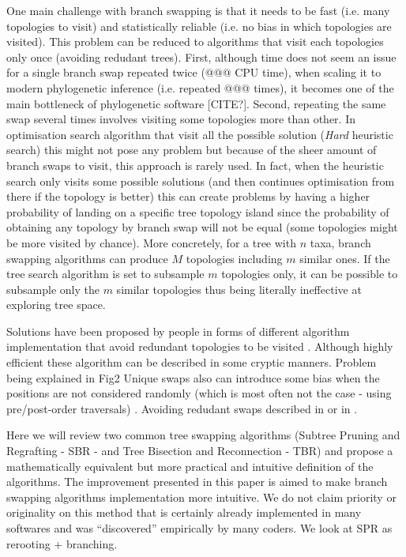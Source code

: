 \documentclass[12pt,letterpaper]{article}
\begin{document}
One main challenge with branch swapping is that it needs to be fast (i.e. many topologies to visit) and statistically reliable (i.e. no bias in which topologies are visited).
This problem can be reduced to algorithms that visit each topologies only once (avoiding redudant trees). \citep{goloboff2014bias}
First, although time does not seem an issue for a single branch swap repeated twice (@@@ CPU time), when scaling it to modern phylogenetic inference (i.e. repeated @@@ times), it becomes one of the main bottleneck of phylogenetic software [CITE?].
Second, repeating the same swap several times involves visiting some topologies more than other.
In optimisation search algorithm that visit all the possible solution (\textit{Hard} heuristic search) %
 this might not pose any problem but because of the sheer amount of branch swaps to visit, this approach is rarely used.
In fact, when the heuristic search only visits some possible solutions (and then continues optimisation from there if the topology is better) this can create problems by having a higher probability of landing on a specific tree topology island since the probability of obtaining any topology by branch swap will not be equal (some topologies might be more visited by chance).
More concretely, for a tree with $n$ taxa, branch swapping algorithms can produce $M$ topologies including $m$ similar ones.
If the tree search algorithm is set to subsample $m$ topologies only, it can be possible to subsample only the $m$ similar topologies thus being literally ineffective at exploring tree space.

Solutions have been proposed by people in forms of different algorithm implementation that avoid redundant topologies to be visited \citep{allen2001subtree}.
Although highly efficient these algorithm can be described in some cryptic manners.
Problem being explained in Fig2 \cite{goloboff2014bias}
Unique swaps also can introduce some bias when the positions are not considered randomly (which is most often not the case - using pre/post-order traversals) \citep{goloboff2014bias}.
Avoiding redudant swaps described in \cite{allen2001subtree} or in \cite{goloboff2014bias}.

Here we will review two common tree swapping algorithms (Subtree Pruning and Regrafting - SBR - and Tree Bisection and Reconnection - TBR) and propose a mathematically equivalent but more practical and intuitive definition of the algorithms.
The improvement presented in this paper is aimed to make branch swapping algorithms implementation more intuitive.
We do not claim priority or originality on this method that is certainly already implemented in many softwares and was ``discovered'' empirically by many coders.
We look at SPR as rerooting + branching.
\end{document}

